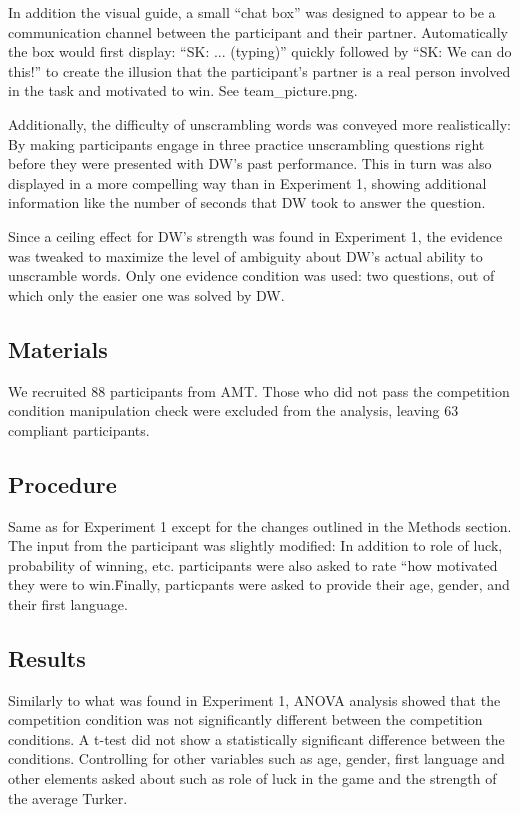 \documentclass{article}
\begin{document}
In addition the visual guide, a small ``chat box'' was designed to appear to be a communication channel between the participant and their partner. Automatically the box would first display: ``SK: ... (typing)'' quickly followed by ``SK: We can do this!'' to create the illusion that the participant's partner is a real person involved in the task and motivated to win. See team\_picture.png.

Additionally, the difficulty of unscrambling words was conveyed more realistically: By making participants engage in three practice unscrambling questions right before they were presented with DW's past performance. This in turn was also displayed in a more compelling way than in Experiment 1, showing additional information like the number of seconds that DW took to answer the question.

Since a ceiling effect for DW's strength was found in Experiment 1, the evidence was tweaked to maximize the level of ambiguity about DW's actual ability to unscramble words. Only one evidence condition was used: two questions, out of which only the easier one was solved by DW.

\subsection{Materials}

We recruited 88 participants from AMT. Those who did not pass the competition condition manipulation check were excluded from the analysis, leaving 63 compliant participants.

\subsection{Procedure}

Same as for Experiment 1 except for the changes outlined in the Methods section. The input from the participant was slightly modified: In addition to role of luck, probability of winning, etc. participants were also asked to rate ``how motivated they were to win.\" Finally, particpants were asked to provide their age, gender, and their first language. 

\subsection{Results}


Similarly to what was found in Experiment 1, ANOVA analysis showed that the competition condition was not significantly different between the competition conditions. A t-test did not show a statistically significant difference between the conditions. Controlling for other variables such as age, gender, first language and other elements asked about such as role of luck in the game and the strength of the average Turker.
\end{document}
